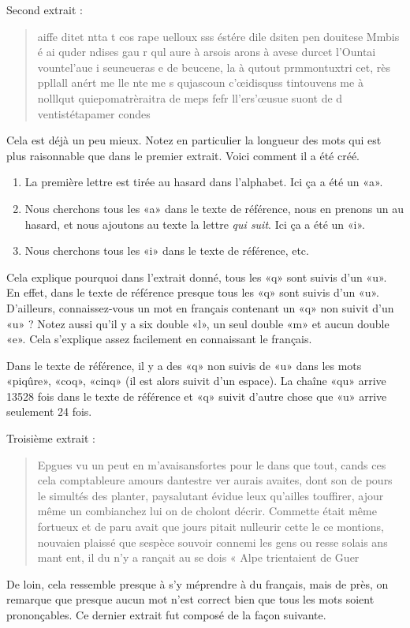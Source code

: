 Second extrait :
\begin{quote}
    aiffe ditet ntta t cos rape uelloux sss éstére dile dsiten pen douitese Mmbis é ai quder ndises gau r qul aure à arsois arons à avese durcet l'Ountai vountel'aue i seuneueras e de beucene, la à qutout prmmontuxtri cet, rès ppllall anért me lle nte me s qujascoun c'œidisquss tintouvens me à nolllqut quiepomatrèraitra de meps fefr ll'ers'œusue suont de d ventistétapamer condes
\end{quote}
Cela est déjà un peu mieux. Notez en particulier la longueur des mots qui est plus raisonnable que dans le premier extrait. Voici comment il a été créé.
\begin{enumerate}
    \item
        La première lettre est tirée au hasard dans l'alphabet. Ici ça a été un «a».
    \item
        Nous cherchons tous les «a» dans le texte de référence, nous en prenons un au hasard, et nous ajoutons au texte la lettre \emph{qui suit}. Ici ça a été un «i». 
    \item
        Nous cherchons tous les «i» dans le texte de référence, etc.
\end{enumerate}
Cela explique pourquoi dans l'extrait donné, tous les «q» sont suivis d'un «u». En effet, dans le texte de référence presque tous les «q» sont suivis d'un «u». D'ailleurs, connaissez-vous un mot en français contenant un «q» non suivit d'un «u» ? Notez aussi qu'il y a six double «l», un seul double «m» et aucun double «e». Cela s'explique assez facilement en connaissant le français.

\begin{remark}
Dans le texte de référence, il y a des «q» non suivis de «u» dans les mots «piqûre», «coq», «cinq» (il est alors suivit d'un espace). La chaîne «qu» arrive 13528 fois dans le texte de référence et «q» suivit d'autre chose que «u» arrive seulement 24 fois.
\end{remark}

Troisième extrait :
\begin{quote}
Epgues vu un peut en m'avaisansfortes pour le dans que tout, cands ces cela comptableure amours dantestre ver aurais avaites, dont son de pours le simultés des planter, paysalutant évidue leux qu'ailles touffirer, ajour même un combianchez lui on de cholont décrir. Commette était même fortueux et de paru avait que jours pitait nulleurir cette le ce montions, nouvaien plaissé que sespèce souvoir connemi les gens ou resse solais ans mant ent, il du n'y a rançait au se dois « Alpe trientaient de Guer
\end{quote}
De loin, cela ressemble presque à s'y méprendre à du français, mais de près, on remarque que presque aucun mot n'est correct bien que tous les mots soient prononçables. Ce dernier extrait fut composé de la façon suivante.

